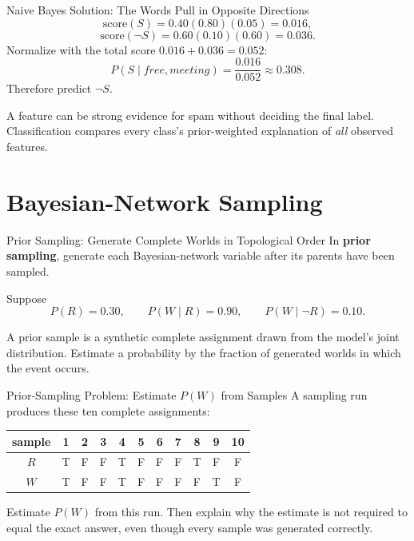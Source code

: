 \documentclass[aspectratio=169,10pt]{beamer}
\begin{document}
\begin{frame}{Naive Bayes Solution: The Words Pull in Opposite Directions}
  \small
  \[
    \text{score}(S)=0.40(0.80)(0.05)=0.016,
  \]
  \[
    \text{score}(\neg S)=0.60(0.10)(0.60)=0.036.
  \]
  Normalize with the total score $0.016+0.036=0.052$:
  \[
    P(S\mid \textit{free},\textit{meeting})
      =\frac{0.016}{0.052}\approx0.308.
  \]
  Therefore predict $\neg S$.
  \begin{keyidea}
    A feature can be strong evidence for spam without deciding the final label. Classification compares every class's prior-weighted explanation of \emph{all} observed features.
  \end{keyidea}
\end{frame}

\section{Bayesian-Network Sampling}

\begin{frame}{Prior Sampling: Generate Complete Worlds in Topological Order}
  In \textbf{prior sampling}, generate each Bayesian-network variable after its parents have been sampled.
  \begin{center}
  \end{center}
  Suppose
  \[
    P(R)=0.30,\qquad P(W\mid R)=0.90,\qquad P(W\mid\neg R)=0.10.
  \]
  \begin{keyidea}
    A prior sample is a synthetic complete assignment drawn from the model's joint distribution. Estimate a probability by the fraction of generated worlds in which the event occurs.
  \end{keyidea}
\end{frame}

\begin{frame}{Prior-Sampling Problem: Estimate $P(W)$ from Samples}
  A sampling run produces these ten complete assignments:
  \begin{center}
    \renewcommand{\arraystretch}{1.35}
    \begin{tabular}{c|cccccccccc}
      sample & 1 & 2 & 3 & 4 & 5 & 6 & 7 & 8 & 9 & 10\\\hline
      $R$ & T & F & F & T & F & F & F & T & F & F\\
      $W$ & T & F & F & T & F & F & F & F & T & F
    \end{tabular}
  \end{center}
  \begin{activity}
    Estimate $P(W)$ from this run. Then explain why the estimate is not required to equal the exact answer, even though every sample was generated correctly.
  \end{activity}
\end{frame}
\end{document}
